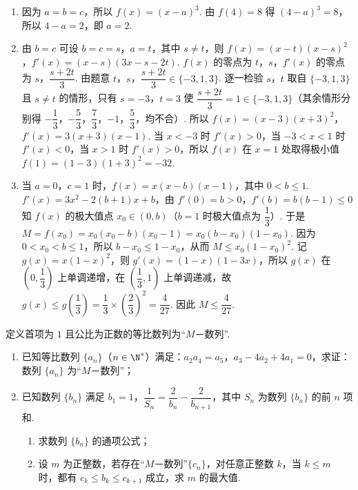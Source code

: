 \begin{solution}
\begin{enumerate}
\item 因为 \(a=b=c\)，所以 \(f(x)=(x-a)^3\). 由 \(f(4)=8\) 得 \((4-a)^3=8\)，所以 \(4-a=2\)，即 \(a=2\).
\item 由 \(b=c\) 可设 \(b=c=s\)，\(a=t\)，其中 \(s\ne t\)，则 \(f(x)=(x-t)(x-s)^2\)，\(f'(x)=(x-s)(3x-s-2t)\). \(f(x)\) 的零点为 \(t\)，\(s\)，\(f'(x)\) 的零点为 \(s\)，\(\dfrac{s+2t}{3}\). 由题意 \(t\)，\(s\)，\(\dfrac{s+2t}{3}\in\{-3,1,3\}\). 逐一检验 \(s\)，\(t\) 取自 \(\{-3,1,3\}\) 且 \(s\ne t\) 的情形，只有 \(s=-3\)，\(t=3\) 使 \(\dfrac{s+2t}{3}=1\in\{-3,1,3\}\)（其余情形分别得 \(-\dfrac13\)，\(-\dfrac53\)，\(\dfrac73\)，\(-1\)，\(\dfrac53\)，均不合）. 所以 \(f(x)=(x-3)(x+3)^2\)，\(f'(x)=3(x+3)(x-1)\). 当 \(x<-3\) 时 \(f'(x)>0\)，当 \(-3<x<1\) 时 \(f'(x)<0\)，当 \(x>1\) 时 \(f'(x)>0\)，所以 \(f(x)\) 在 \(x=1\) 处取得极小值 \(f(1)=(1-3)(1+3)^2=-32\).
\item 当 \(a=0\)，\(c=1\) 时，\(f(x)=x(x-b)(x-1)\)，其中 \(0<b\le1\). \(f'(x)=3x^2-2(b+1)x+b\)，由 \(f'(0)=b>0\)，\(f'(b)=b(b-1)\le0\) 知 \(f(x)\) 的极大值点 \(x_0\in(0,b)\)（\(b=1\) 时极大值点为 \(\dfrac13\)）. 于是 \(M=f(x_0)=x_0(x_0-b)(x_0-1)=x_0(b-x_0)(1-x_0)\). 因为 \(0<x_0<b\le1\)，所以 \(b-x_0\le1-x_0\)，从而 \(M\le x_0(1-x_0)^2\). 记 \(g(x)=x(1-x)^2\)，则 \(g'(x)=(1-x)(1-3x)\)，所以 \(g(x)\) 在 \(\left(0,\dfrac13\right)\) 上单调递增，在 \(\left(\dfrac13,1\right)\) 上单调递减，故 \(g(x)\le g\left(\dfrac13\right)=\dfrac13\times\left(\dfrac23\right)^2=\dfrac4{27}\). 因此 \(M\le\dfrac4{27}\).
\end{enumerate}
\end{solution}

\begin{problem}
定义首项为 \(1\) 且公比为正数的等比数列为“\(M\)－数列”.

\begin{enumerate}
\item 已知等比数列 \(\{a_n\}\)（\(n\in\N^*\)）满足：\(a_2a_4=a_5\)，\(a_3-4a_2+4a_1=0\)，求证：数列 \(\{a_n\}\) 为“\(M\)－数列”；
\item 已知数列 \(\{b_n\}\) 满足 \(b_1=1\)，\(\dfrac1{S_n}=\dfrac2{b_n}-\dfrac2{b_{n+1}}\)，其中 \(S_n\) 为数列 \(\{b_n\}\) 的前 \(n\) 项和.
\begin{enumerate}
\item 求数列 \(\{b_n\}\) 的通项公式；
\item 设 \(m\) 为正整数，若存在“\(M\)－数列”\(\{c_n\}\)，对任意正整数 \(k\)，当 \(k\le m\) 时，都有 \(c_k\le b_k\le c_{k+1}\) 成立，求 \(m\) 的最大值.
\end{enumerate}
\end{enumerate}

\end{problem}

